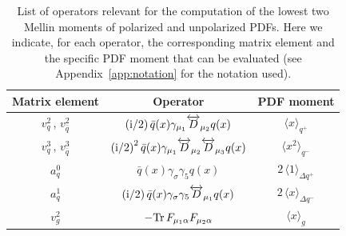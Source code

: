 \begin{table}
\renewcommand{\arraystretch}{1.6} 
\centering
\begin{tabular}{@{}ccc@{}}
\toprule
Matrix element & Operator & PDF moment \\ 
\midrule
$v_q^2$\,, $v_{\bar{q}}^2$  & 
$\displaystyle \left({\rm i}/2\right) \bar{q}(x)\gamma_{\mu_1} \overleftrightarrow{D}_{\mu_2} q(x)$ & 
$\langle x \rangle_{q^+}$\\
$v_q^3$\,, $v_{\bar{q}}^3$  & $\displaystyle \left({\rm i}/2\right)^2 \bar{q}(x)\gamma_{\mu_1} \overleftrightarrow{D}_{\mu_2} \overleftrightarrow{D}_{\mu_3} q(x)$ & $\langle x^2 \rangle_{q^-}$\\
$a_q^0$ & $\displaystyle \bar{q}(x)\gamma_{\sigma} \gamma_5 q(x)$ & 
$2\, \langle 1 \rangle_{\Delta q^+}$ \\
$a_q^1$ & $\displaystyle \left({\rm i}/2\right) \bar{q}(x)\gamma_{\sigma} \gamma_5 \overleftrightarrow{D}_{\mu_1} q(x)$ & $2\, \langle x \rangle_{\Delta q^-}$ \\
$v_g^2$ & $\displaystyle - {\rm Tr}\, F_{\mu_1\alpha}F_{\mu_2\alpha}$ & $\langle x \rangle_g$ \\
\bottomrule
\end{tabular}
\caption{\label{Tab:twist2}
\small List of operators relevant for the computation of the lowest two 
Mellin moments of polarized and unpolarized PDFs.
%
Here we indicate, for each operator, the corresponding matrix element and
the specific PDF moment that can be evaluated (see
Appendix~\ref{app:notation} for the notation used).
}
\end{table}

